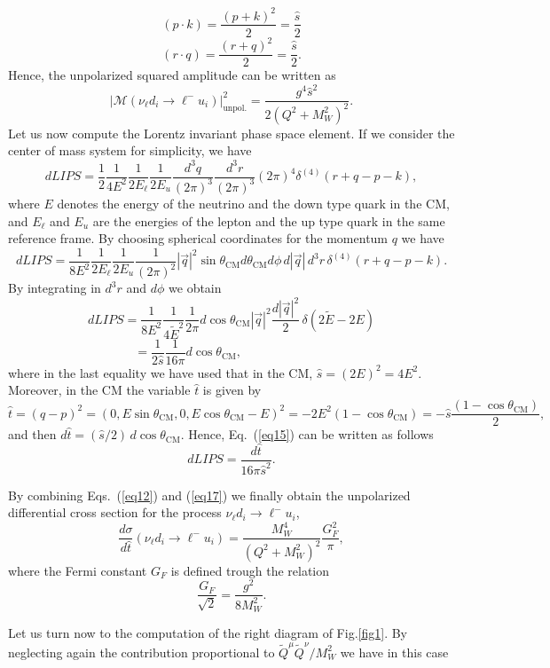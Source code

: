 \documentclass[aps,preprint,tightenlines,floatfix,superscriptaddress,nofootinbib,showpacs]{revtex4-1}
\def\beq{\begin{equation}}
\def\eeq{\end{equation}}
\begin{document}
\beq
\label{eq10}
(p\cdot k)=\frac{(p + k)^2}{2}= \frac{\hat{s}}{2}
\eeq
\beq
\label{eq11}
(r\cdot q)=\frac{(r + q)^2}{2}= \frac{\hat{s}}{2}.
\eeq
Hence, the unpolarized squared amplitude can be written as
\beq
\label{eq12}
|\mathcal{M}(\nu_{\ell}d_i \rightarrow \ell^- u_i)|^2_{\mathrm{unpol.}}=\frac{g^4 \hat{s}^2}{2(Q^2+M^2_W)^2}.
\eeq
Let us now compute the Lorentz invariant phase space element. If we consider the center of mass system for simplicity, we have
\beq
\label{eq13}
dLIPS =\frac{1}{2}\frac{1}{4E^2}\frac{1}{2E_{\ell}}\frac{1}{2E_{u}}\frac{d^3q}{(2\pi)^3}\frac{d^3r}{(2\pi)^3} (2\pi)^4 \delta^{(4)}(r+q-p-k),
\eeq
where $E$ denotes the energy of the neutrino and the down type quark in the $\mathrm{CM}$, and $E_{\ell}$ and $E_{u}$ are the energies of the lepton and the up type quark in the same reference frame. By choosing spherical coordinates for the momentum $q$ we have
\beq
\label{eq14}
dLIPS = \frac{1}{8E^2}\frac{1}{2E_{\ell}}\frac{1}{2E_{u}}\frac{1}{(2\pi)^2} |\vec{q}|^2 \sin\theta_{\mathrm{CM}} d\theta_{\mathrm{CM}} d\phi\, d|\vec{q}| \,d^3r \,\delta^{(4)}(r+q-p-k).
\eeq
By integrating in $d^3 r$ and $d\phi$ we obtain
\beq
\nonumber
dLIPS =  \frac{1}{8E^2}\frac{1}{4\tilde{E}^2}\frac{1}{2\pi} d\cos\theta_{\mathrm{CM}} |\vec{q}|^2 \frac{d|\vec{q}|^2}{2}\,\delta (2\tilde{E}-2E) 
\eeq
\beq
\label{eq15}
\,=\frac{1}{2\hat{s}}\frac{1}{16\pi}d\cos\theta_{\mathrm{CM}},\hspace{3cm}
\eeq
where in the last equality we have used that in the $\mathrm{CM}$, $\hat{s}=(2E)^2=4E^2$. Moreover, in the $\mathrm{CM}$ the variable $\hat{t}$ is given by
\beq
\label{eq16}
\hat{t}=(q-p)^2 = (0,E\sin\theta_{\mathrm{CM}},0,E\cos\theta_{\mathrm{CM}}-E)^2=-2E^2(1-\cos\theta_{\mathrm{CM}})=-\hat{s}\frac{(1-\cos\theta_{\mathrm{CM}})}{2},
\eeq
and then $d\hat{t}=(\hat{s}/2)\,d\cos\theta_{\mathrm{CM}}$. Hence, Eq.~(\ref{eq15}) can be written as follows
\beq
\label{eq17}
dLIPS = \frac{d\hat{t}}{16\pi\hat{s}^2}.
\eeq
\par By combining Eqs.~(\ref{eq12}) and (\ref{eq17}) we finally obtain the unpolarized differential cross section for the process $\nu_{\ell}d_i \rightarrow \ell^- u_i$,
\beq
\label{eq18}
\frac{d\sigma}{d\hat{t}}(\nu_{\ell}d_i \rightarrow \ell^- u_i)=\frac{M^4_W}{(Q^2+M^2_W)^2}\frac{G^2_F}{\pi},
\eeq 
where the Fermi constant $G_F$ is defined trough the relation
\beq
\label{eq19}
\frac{G_F}{\sqrt{2}}=\frac{g^2}{8M^2_W}.
\eeq
\par
Let us turn now to the computation of the right diagram of Fig.\ref{fig1}. By neglecting again the contribution proportional to $\tilde{Q}^{\mu}\tilde{Q}^{\nu}/M^2_W$ we have in this case
\end{document}
